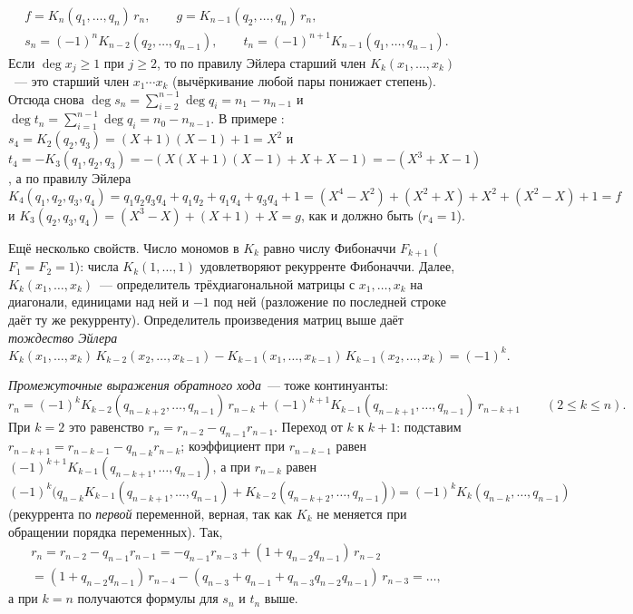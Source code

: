 \begin{aside}[1.8e: континуанты]
\begin{gather*}
f=K_n(q_1,\dots,q_n)\,r_n,\qquad g=K_{n-1}(q_2,\dots,q_n)\,r_n,\\
s_n=(-1)^nK_{n-2}(q_2,\dots,q_{n-1}),\qquad t_n=(-1)^{n+1}K_{n-1}(q_1,\dots,q_{n-1}).
\end{gather*}
Если $\deg x_j\ge1$ при $j\ge2$, то по правилу Эйлера старший член $K_k(x_1,\dots,x_k)$~--- это старший член
$x_1\cdots x_k$ (вычёркивание любой пары понижает степень). Отсюда снова $\deg s_n=\sum_{i=2}^{n-1}\deg q_i=n_1-n_{n-1}$ и
$\deg t_n=\sum_{i=1}^{n-1}\deg q_i=n_0-n_{n-1}$. В примере : $s_4=K_2(q_2,q_3)=(X+1)(X-1)+1=X^2$ и
$t_4=-K_3(q_1,q_2,q_3)=-(X(X+1)(X-1)+X+X-1)=-(X^3+X-1)$, а по правилу Эйлера
\[
K_4(q_1,q_2,q_3,q_4)=q_1q_2q_3q_4+q_1q_2+q_1q_4+q_3q_4+1=(X^4-X^2)+(X^2+X)+X^2+(X^2-X)+1=f
\]
и $K_3(q_2,q_3,q_4)=(X^3-X)+(X+1)+X=g$, как и должно быть ($r_4=1$).

Ещё несколько свойств. Число мономов в $K_k$ равно числу Фибоначчи $F_{k+1}$ ($F_1=F_2=1$): числа $K_k(1,\dots,1)$
удовлетворяют рекурренте Фибоначчи. Далее, $K_k(x_1,\dots,x_k)$~--- определитель трёхдиагональной матрицы с
$x_1,\dots,x_k$ на диагонали, единицами над ней и $-1$ под ней (разложение по последней строке даёт ту же рекурренту).
Определитель произведения матриц выше даёт \emph{тождество Эйлера}
\[
K_k(x_1,\dots,x_k)\,K_{k-2}(x_2,\dots,x_{k-1})-K_{k-1}(x_1,\dots,x_{k-1})\,K_{k-1}(x_2,\dots,x_k)=(-1)^k .
\]

\emph{Промежуточные выражения обратного хода}~--- тоже континуанты:
\[
r_n=(-1)^kK_{k-2}(q_{n-k+2},\dots,q_{n-1})\,r_{n-k}+(-1)^{k+1}K_{k-1}(q_{n-k+1},\dots,q_{n-1})\,r_{n-k+1}
\qquad(2\le k\le n).
\]
При $k=2$ это равенство $r_n=r_{n-2}-q_{n-1}r_{n-1}$. Переход от $k$ к $k+1$: подставим
$r_{n-k+1}=r_{n-k-1}-q_{n-k}r_{n-k}$; коэффициент при $r_{n-k-1}$ равен $(-1)^{k+1}K_{k-1}(q_{n-k+1},\dots,q_{n-1})$, а
при $r_{n-k}$ равен
$(-1)^k\bigl(q_{n-k}K_{k-1}(q_{n-k+1},\dots,q_{n-1})+K_{k-2}(q_{n-k+2},\dots,q_{n-1})\bigr)=(-1)^kK_k(q_{n-k},\dots,q_{n-1})$
(рекуррента по \emph{первой} переменной, верная, так как $K_k$ не меняется при обращении порядка переменных). Так,
\begin{multline*}
r_n=r_{n-2}-q_{n-1}r_{n-1}=-q_{n-1}r_{n-3}+(1+q_{n-2}q_{n-1})\,r_{n-2}\\
=(1+q_{n-2}q_{n-1})\,r_{n-4}-(q_{n-3}+q_{n-1}+q_{n-3}q_{n-2}q_{n-1})\,r_{n-3}=\dots,
\end{multline*}
а при $k=n$ получаются формулы для $s_n$ и $t_n$ выше.
\end{aside}

